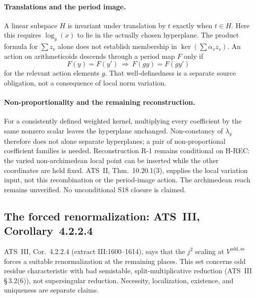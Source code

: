 \documentclass[11pt,a4paper]{article}
\theoremstyle{definition}
\theoremstyle{remark}
\begin{document}
\paragraph{Translations and the period image.}
A linear subspace $H$ is invariant under translation by $t$ exactly when
$t\in H$. Here this requires $\log_y(x)$ to lie in the actually chosen
hyperplane. The product formula for $\sum z_v$ alone does not establish
membership in $\ker(\sum\alpha_v z_v)$. An action on arithmeticoids descends
through a period map $F$ only if
\[
 F(y)=F(y')\ \Longrightarrow\ F(gy)=F(gy')
\]
for the relevant action elements $g$. That well-definedness is a separate
source obligation, not a consequence of local norm variation.

\paragraph{Non-proportionality and the remaining reconstruction.}
For a consistently defined weighted kernel, multiplying every coefficient
by the same nonzero scalar leaves the hyperplane unchanged. Non-constancy
of $\lambda_y$ therefore does not alone separate hyperplanes; a pair of
non-proportional coefficient families is needed. Reconstruction R-1 remains
conditional on H-REC: the varied non-archimedean local point can be inserted
while the other coordinates are held fixed. ATS~II, Thm.~10.20.1(3), supplies
the local variation input, not this recombination or the period-image action.
The archimedean reach remains unverified. No unconditional S18 closure is
claimed.

\subsection{The forced renormalization: ATS~III, Corollary~4.2.2.4}\label{sec:s16}

ATS~III, Cor.~4.2.2.4 (extract III:1600--1614), says that the $j^2$ scaling
at $V^{\mathrm{odd,ss}}$ forces a suitable renormalization at the remaining
places. This set concerns odd residue characteristic with bad semistable,
split-multiplicative reduction (ATS~III \S\,3.2(6)), not supersingular
reduction. Necessity, localization, existence, and uniqueness are separate
claims.
\end{document}
